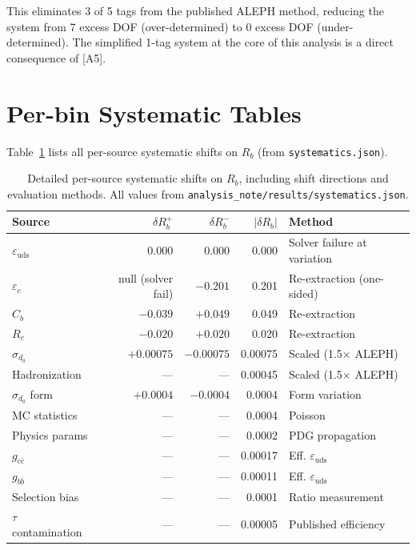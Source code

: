 \documentclass[11pt,a4paper]{article}
\begin{document}
This eliminates 3 of 5 tags from the published ALEPH method, reducing the system from
7 excess DOF (over-determined) to 0 excess DOF (under-determined). The simplified
1-tag system at the core of this analysis is a direct consequence of [A5].

\clearpage


\clearpage
\appendix

\section{Per-bin Systematic Tables}
\label{app:syst-tables}

Table~\ref{tab:syst_perbin_rb} lists all per-source systematic shifts on $R_b$
(from \texttt{systematics.json}).

\begin{table}[htbp]
\centering
\caption{Detailed per-source systematic shifts on $R_b$, including shift directions
and evaluation methods. All values from \texttt{analysis\_note/results/systematics.json}.}
\label{tab:syst_perbin_rb}
\small
\begin{tabular}{lrrrl}
\toprule
Source & $\delta R_b^{+}$ & $\delta R_b^{-}$ & $|\delta R_b|$ & Method \\
\midrule
$\varepsilon_\mathrm{uds}$ & $0.000$ & $0.000$ & 0.000 & Solver failure at variation \\
$\varepsilon_c$ & null (solver fail) & $-0.201$ & 0.201 & Re-extraction (one-sided) \\
$C_b$ & $-0.039$ & $+0.049$ & 0.049 & Re-extraction \\
$R_c$ & $-0.020$ & $+0.020$ & 0.020 & Re-extraction \\
$\sigma_{d_0}$ & $+0.00075$ & $-0.00075$ & 0.00075 & Scaled (1.5$\times$ ALEPH) \\
Hadronization & --- & --- & 0.00045 & Scaled (1.5$\times$ ALEPH) \\
$\sigma_{d_0}$ form & $+0.0004$ & $-0.0004$ & 0.0004 & Form variation \\
MC statistics & --- & --- & 0.0004 & Poisson \\
Physics params & --- & --- & 0.0002 & PDG propagation \\
$g_{c\bar{c}}$ & --- & --- & 0.00017 & Eff. $\varepsilon_\mathrm{uds}$ \\
$g_{b\bar{b}}$ & --- & --- & 0.00011 & Eff. $\varepsilon_\mathrm{uds}$ \\
Selection bias & --- & --- & 0.0001 & Ratio measurement \\
$\tau$ contamination & --- & --- & 0.00005 & Published efficiency \\
\bottomrule
\end{tabular}
\end{table}
\end{document}
